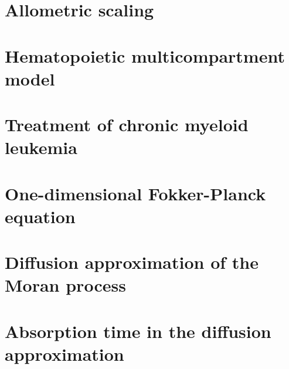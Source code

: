 \newcommand{\package}{\emph}

\setcounter{chapter}{1}
\setcounter{section}{0}
\section{Allometric scaling}

\setcounter{chapter}{2}
\setcounter{section}{0}
\section{Hematopoietic multicompartment model}

\setcounter{chapter}{3}
\setcounter{section}{0}
\section{Treatment of chronic myeloid leukemia}

\setcounter{chapter}{4}
\setcounter{section}{0}
\section{One-dimensional Fokker-Planck equation}

\setcounter{chapter}{5}
\setcounter{section}{0}
\section{Diffusion approximation of the Moran process}

\setcounter{chapter}{6}
\setcounter{section}{0}
\section{Absorption time in the diffusion approximation}
